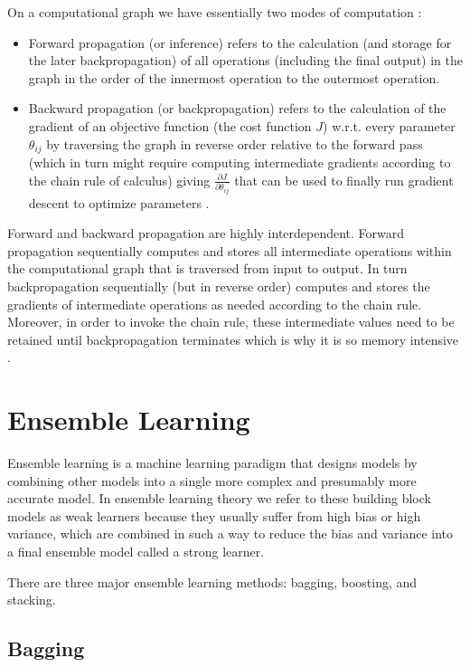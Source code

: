 On a computational graph we have essentially two modes of computation \cite{deeplearning}:

\begin{itemize}
    \item Forward propagation (or inference) refers to the calculation (and storage for the later backpropagation) of all operations (including the final output) in the graph in the order of the innermost operation to the outermost operation.
    \item Backward propagation (or backpropagation) refers to the calculation of the gradient of an objective function (the cost function $J$) w.r.t. every parameter $\theta_{ij}$ by traversing the graph in reverse order relative to the forward pass (which in turn might require computing intermediate gradients according to the chain rule of calculus) giving $\frac{\partial J}{\partial \theta_{ij}}$ that can be used to finally run gradient descent to optimize parameters \cite{deeplearning}.
\end{itemize}

Forward and backward propagation are highly interdependent. Forward propagation sequentially computes and stores all intermediate operations within the computational graph that is traversed from input to output. In turn backpropagation sequentially (but in reverse order) computes and stores the gradients of intermediate operations as needed according to the chain rule. Moreover, in order to invoke the chain rule, these intermediate values need to be retained until backpropagation terminates which is why it is so memory intensive \cite{deeplearning}.

\section{Ensemble Learning}

Ensemble learning is a machine learning paradigm that designs models by combining other models into a single more complex and presumably more accurate model. In ensemble learning theory we refer to these building block models as weak learners because they usually suffer from high bias or high variance, which are combined in such a way to reduce the bias and variance into a final ensemble model called a strong learner.

There are three major ensemble learning methods: bagging, boosting, and stacking.

\subsection{Bagging}

